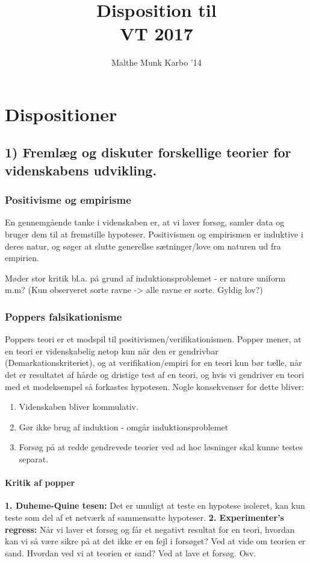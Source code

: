 \documentclass[a4paper,oneside,12pt]{memoir}
\title{Disposition til \\\textbf{VT 2017}}
\author{Malthe Munk Karbo '14}
\begin{document}
\maketitle
\tableofcontents
\newpage
\chapter{Dispositioner}
\section{1) Fremlæg og diskuter forskellige teorier for videnskabens udvikling.}
\subsection{Positivisme og empirisme}
En gennemgående tanke i videnskaben er, at vi laver forsøg, samler data og bruger dem til at fremstille hypoteser. Positivismen og empirismen er induktive i deres natur, og søger at slutte generellse sætninger/love om naturen ud fra empirien.

Møder stor kritik bl.a. på grund af induktionsproblemet - er nature uniform m.m? (Kun observeret sorte ravne -> alle ravne er sorte. Gyldig lov?)
\subsection{Poppers falsikationisme}
Poppers teori er et modspil til positivismen/verifikationismen. Popper mener, at en teori er videnskabelig netop kun når den er gendrivbar (Demarkationskriteriet), og at verifikation/empiri for en teori kun bør tælle, når det er resultatet af hårde og dristige test af en teori, og hvis vi gendriver en teori med et modeksempel så forkastes hypotesen. Nogle konsekvenser for dette bliver:
\begin{enumerate}
\item Videnskaben bliver kommulativ.
\item Gør ikke brug af induktion - omgår induktionsproblemet
\item Forsøg på at redde gendrevede teorier ved ad hoc løsninger skal kunne testes separat.
\end{enumerate}

\subsubsection{Kritik af popper}
\textbf{1. Duheme-Quine tesen:}
Det er umuligt at teste en hypotese isoleret, kan kun teste som del af et netværk af sammensatte hypoteser. 
\textbf{2. Experimenter's regress:}
Når vi laver et forsøg og får et negativt resultat for en teori, hvordan kan vi så være sikre på at det ikke er en fejl i forsøget? Ved at vide om teorien er sand. Hvordan ved vi at teorien er sand? Ved at lave et forsøg. Osv.
\end{document}
